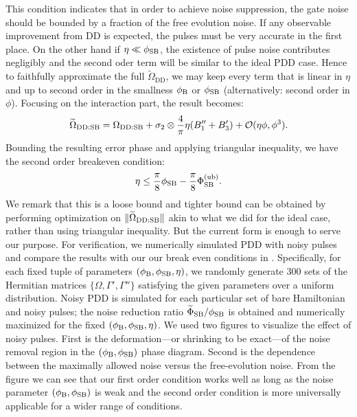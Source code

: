 \documentclass[b5paper,11pt]{article}
\newcommand{\wt}[1]{\widetilde{#1}}
\newcommand{\rDD}{\mathrm{DD}}
\begin{document}
This condition indicates that in order to achieve noise suppression, the gate noise should be bounded by a fraction of the free evolution noise. If any observable improvement from DD is expected, the pulses must be very accurate in the first place.   On the other hand if $\eta\ll \phi_{\mathrm{SB}}$, the existence of pulse noise contributes negligibly and the second oder term will be similar to the ideal PDD case. Hence to faithfully approximate the full $\wt\Omega_\rDD$, we may keep every term that is linear in $\eta$ and up to second order in the smallness $\phi_{\mathrm{B}}$ or $\phi_{\mathrm{SB}}$ (alternatively: second order in $\phi$). Focusing on the interaction part, the result becomes:
\begin{equation}
 \wt\Omega_{\rDD:\rSB} = \Omega_{\rDD:\rSB} +\sigma_2 \otimes \frac{4}{\pi}\eta(B_1''+B_3') + \cO(\eta\phi,\phi^3).
\end{equation}
Bounding the resulting error phase and applying triangular inequality, we have the second order breakeven condition:
\begin{equation}\label{eq:npulses-breakeven2}
   \eta \le \frac{\pi}{8} \phi_{\mathrm{SB}} - \frac{\pi}{8}\Phi_{\mathrm{SB}}^{(\mathrm{ub})}.
\end{equation}
We remark that this is a loose bound and tighter bound can be obtained by performing optimization on $\norm{\wt\Omega_{\rDD:\rSB}}$ akin to what we did for the ideal case, rather than using triangular inequality. But the current form is enough to serve our purpose. 
For verification, we numerically simulated PDD with noisy pulses and compare the results with our our break even conditions in . 
Specifically, for each fixed tuple of parameters $(\phi_{\mathrm{B}},\phi_{\mathrm{SB}},\eta)$, we randomly generate 300 sets of the Hermitian matrices $\{\Omega,\Gamma',\Gamma''\}$
satisfying the given parameters over a uniform distribution. Noisy PDD is simulated for each particular set of  bare Hamiltonian and noisy pulses; the noise reduction ratio $\wt\Phi_\rSB/\phi_\rSB$ is obtained and numerically maximized for the fixed $(\phi_{\mathrm{B}},\phi_{\mathrm{SB}},\eta)$. 
We used two figures to visualize the effect of noisy pulses. First is the deformation---or shrinking to be exact---of the noise removal region in the $(\phi_{\mathrm{B}},\phi_{\mathrm{SB}})$ phase diagram. Second is the dependence between the maximally allowed noise versus the free-evolution noise. From the figure we can see that our first order condition works well as long as the noise parameter $(\phi_{\mathrm{B}},\phi_{\mathrm{SB}})$ is weak and the second order condition is more universally applicable for a wider range of conditions.
\end{document}
